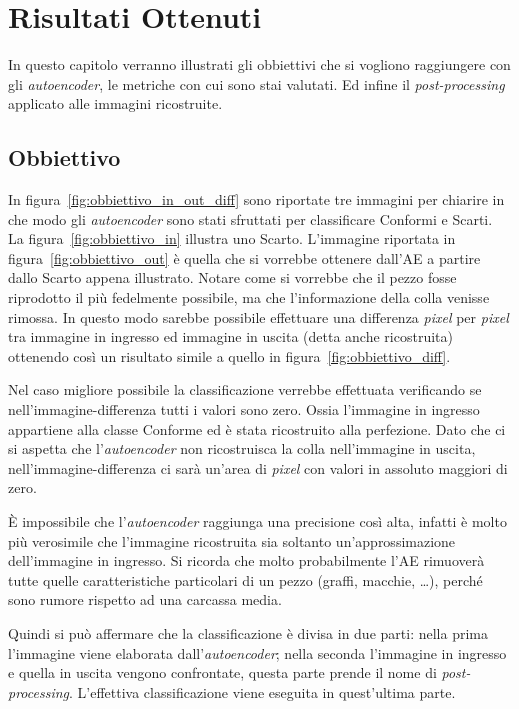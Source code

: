 
\chapter{Risultati Ottenuti}
In questo capitolo verranno illustrati gli obbiettivi che si vogliono raggiungere con gli \textit{autoencoder}, le metriche con cui sono stai valutati.
Ed infine il \textit{post-processing} applicato alle immagini ricostruite.

\section{Obbiettivo}
In figura~\ref{fig:obbiettivo_in_out_diff} sono riportate tre immagini per chiarire in che modo gli \textit{autoencoder} sono stati sfruttati per classificare Conformi e Scarti.
La figura~\ref{fig:obbiettivo_in} illustra uno Scarto.
L'immagine riportata in figura~\ref{fig:obbiettivo_out} è quella che si vorrebbe ottenere dall'AE a partire dallo Scarto appena illustrato.
Notare come si vorrebbe che il pezzo fosse riprodotto il più fedelmente possibile, ma che l'informazione della colla venisse rimossa.
In questo modo sarebbe possibile effettuare una differenza \textit{pixel} per \textit{pixel} tra immagine in ingresso ed immagine in uscita (detta anche ricostruita) ottenendo così un risultato simile a quello in figura~\ref{fig:obbiettivo_diff}.

Nel caso migliore possibile la classificazione verrebbe effettuata verificando se nell'immagine-differenza tutti i valori sono zero.
Ossia l'immagine in ingresso appartiene alla classe Conforme ed è stata ricostruito alla perfezione.
Dato che ci si aspetta che l'\textit{autoencoder} non ricostruisca la colla nell'immagine in uscita, nell'immagine-differenza ci sarà un'area di \textit{pixel} con valori in assoluto maggiori di zero.

È impossibile che l'\textit{autoencoder} raggiunga una precisione così alta, infatti è molto più verosimile che l'immagine ricostruita sia soltanto un'approssimazione dell'immagine in ingresso.
Si ricorda che molto probabilmente l'AE rimuoverà tutte quelle caratteristiche particolari di un pezzo (graffi, macchie, \dots ), perché sono rumore rispetto ad una carcassa media.

Quindi si può affermare che la classificazione è divisa in due parti: nella prima l'immagine viene elaborata dall'\textit{autoencoder}; nella seconda l'immagine in ingresso e quella in uscita vengono confrontate, questa parte prende il nome di \textit{post-processing}.
L'effettiva classificazione viene eseguita in quest'ultima parte.

